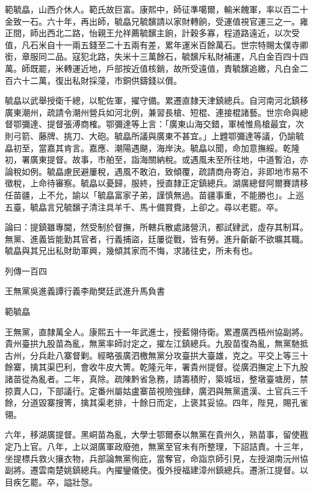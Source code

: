 \begin{pinyinscope}
範毓皛，山西介休人。範氏故巨富。康熙中，師征準噶爾，輸米餽軍，率以百二十金致一石。六十年，再出師，毓皛兄毓馪請以家財轉餉，受運值視官運三之一。雍正間，師出西北二路，怡親王允祥薦毓馪主餉，計穀多寡，程道路遠近，以次受值，凡石米自十一兩五錢至二十五兩有差，累年運米百餘萬石。世宗特賜太僕寺卿銜，章服同二品。寇犯北路，失米十三萬餘石，毓馪斥私財補運，凡白金百四十四萬。師既罷，米轉運近地，戶部按近值核銷，故所受遠值，責毓馪追繳，凡白金二百六十二萬，復出私財採蓡，市銅供鑄錢以償。

毓皛以武舉授衛千總，以駝佐軍，擢守備。累遷直隸天津鎮總兵。自河南河北鎮移廣東潮州，疏請令潮州營兵如河北例，兼習長槍、短棍、連接棍諸藝。世宗命與總督鄂彌達、提督張溥商榷。鄂彌達等上言：「廣東山海交錯，軍械惟鳥槍最宜，次則弓箭、藤牌、挑刀、大砲。毓皛所議與廣東不甚宜。」上韙鄂彌達等議，仍諭毓皛初至，當嘉其肯言。嘉應、潮陽遇颶，海岸決。毓皛以聞，命加意撫綏。乾隆初，署廣東提督。故事，市舶至，詣海關納稅。或遇風未至所往地，中道暫泊，亦論稅如例。毓皛慮民避屢稅，遇風不敢泊，致傾覆，疏請商舟寄泊，非即地市易不徵稅，上命待審察。毓皛以憂歸，服終，授直隸正定鎮總兵。湖廣總督阿爾賽請移任苗疆，上不允，諭以「毓皛富家子弟，謹慎無過。苗疆事重，不能勝也」。上巡五臺，毓皛言兄毓馪子清注具羊千、馬十備賞賚，上卻之。尋以老罷。卒。

論曰：提鎮雖專閫，然受制於督撫，所轄兵散處諸營汛，都試肄武，虛存其制耳。無黨、進義皆能勤其官者，行義捕盜，廷屢從戰，皆有勞。進升齗齗不欲曠其職。毓皛與其兄出私財助軍興，幾傾其家而不悔，求諸往史，所未有也。

列傳一百四

王無黨吳進義譚行義李勛樊廷武進升馬負書

範毓皛

王無黨，直隸萬全人。康熙五十一年武進士，授藍翎侍衛。累遷廣西梧州協副將。貴州臺拱九股苗為亂，無黨率師討定之，擢左江鎮總兵。九股苗復為亂，無黨馳抵古州，分兵赴八寨督剿。經略張廣泗檄無黨分攻臺拱大臺雄，克之。平交上等三十餘寨，擒其渠巴利，會收牛皮大箐。乾隆元年，署貴州提督。從廣泗撫定上下九股諸苗從為亂者。二年，真除。疏陳黔省急務，請籌積貯，築城垣，整墩臺塘房，禁掠賣人口，下部議行。定番州屬姑盧寨苗視險強肆，廣泗與無黨遣漢、土官兵三千餘，分道毀寨搜箐，擒其渠老排，十餘日而定，上褒其妥協。四年，陛見，賜孔雀翎。

六年，移湖廣提督。黑峒苗為亂，大學士鄂爾泰以無黨在貴州久，熟苗事，留使戡定乃上官。八年，上以湖廣軍政廢弛，無黨至官未有所整理，下詔詰責。十三年，坐提標兵救火攘衣物，兵部論無黨徇庇，當奪官，命詣京師引見，左授湖南沅州協副將。遷雲南楚姚鎮總兵。內擢鑾儀使。復外授福建漳州鎮總兵。遷浙江提督。以目疾乞罷。卒，謚壯愨。


\end{pinyinscope}
